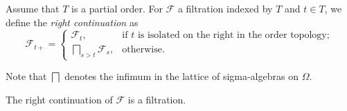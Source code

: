 \begin{definition}\label{def:rightLimitFiltration}
  \leanok
Assume that $T$ is a partial order. For $\mathcal{F}$ a filtration indexed by $T$ and $t \in T$, we define the \emph{right continuation} as
$$\mathcal{F}_{t+} =
  \begin{cases}
    \mathcal{F}_t, & \text{if $t$ is isolated on the right in the order topology}; \\
    \bigsqcap_{s > t} \mathcal{F}_s, & \text{otherwise}.
  \end{cases}
$$

Note that $\bigsqcap$ denotes the infimum in the lattice of sigma-algebras on $\Omega$.
\end{definition}


\begin{lemma}\label{lem:filtrationRightCont}
  \leanok
The right continuation of $\mathcal{F}$ is a filtration.
\end{lemma}

